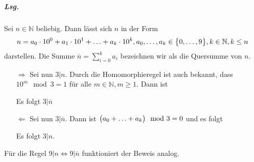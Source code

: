 \documentclass{scrreprt}
\begin{document}
\begin{landscape}
\subparagraph{Lsg.} Sei $n \in \mathbb{N}$ beliebig.
Dann lässt sich $n$ in der Form
\[
  n = a_0 \cdot 10^0 + a_1 \cdot 10^1 + \ldots + a_k \cdot 10^k,
  a_0, \ldots, a_k \in \qty\big{0, \ldots, 9}, k \in \mathbb{N}, k \leq n
\]
darstellen.
Die Summe $\overline{n} = \sum_{i = 0}^{k} a_i$ bezeichnen wir als die Quersumme
von $n$.
\begin{itemize}
\item[$\Rightarrow$] Sei nun $3|n$.
  Durch die Homomorphieregel ist auch bekannt, dass $10^m \mod 3 = 1$ für alle
  $m \in \mathbb{N}, m \geq 1$.
  Dann ist
  Es folgt $3|\overline{n}$
\end{itemize}
\end{landscape}
\newpage
\begin{itemize}
\item[$\Leftarrow$] Sei nun $3|\overline{n}$.
  Dann ist $\qty\big(a_0 + \ldots + a_k) \mod 3 = 0$ und es folgt
  Es folgt $3|n$.
\end{itemize}
Für die Regel $9|n \iff 9|\overline{n}$ funktioniert der Beweis analog.
\end{document}

